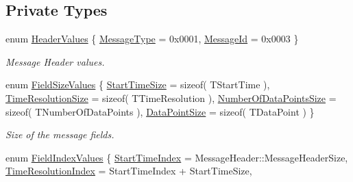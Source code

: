 \subsection*{Private Types}
\begin{DoxyCompactItemize}
\item 
enum \hyperlink{class_terra_swarm_1_1_asynchronous_1_1_client_data_ab125e3c9367fdafbd7adfcee2f4916ca}{Header\-Values} \{ \hyperlink{class_terra_swarm_1_1_asynchronous_1_1_client_data_ab125e3c9367fdafbd7adfcee2f4916caade31247f7e6ce63ad9d29f262e71f1f3}{Message\-Type} = 0x0001, 
\hyperlink{class_terra_swarm_1_1_asynchronous_1_1_client_data_ab125e3c9367fdafbd7adfcee2f4916caa9b9e910bbc8034727a892e32130a6a88}{Message\-Id} = 0x0003
 \}
\begin{DoxyCompactList}\small\item\em Message Header values. \end{DoxyCompactList}\item 
enum \hyperlink{class_terra_swarm_1_1_asynchronous_1_1_client_data_ac66a46fcb609d1205cef15f85cd551b0}{Field\-Size\-Values} \{ \hyperlink{class_terra_swarm_1_1_asynchronous_1_1_client_data_ac66a46fcb609d1205cef15f85cd551b0a669ddc8638e4c5d6c0ae519ff59f66c1}{Start\-Time\-Size} = sizeof( T\-Start\-Time ), 
\hyperlink{class_terra_swarm_1_1_asynchronous_1_1_client_data_ac66a46fcb609d1205cef15f85cd551b0ac13dfbedd3bb3241adca682ae0cae309}{Time\-Resolution\-Size} = sizeof( T\-Time\-Resolution ), 
\hyperlink{class_terra_swarm_1_1_asynchronous_1_1_client_data_ac66a46fcb609d1205cef15f85cd551b0a5042b9a88db56411ee2879d930f5defb}{Number\-Of\-Data\-Points\-Size} = sizeof( T\-Number\-Of\-Data\-Points ), 
\hyperlink{class_terra_swarm_1_1_asynchronous_1_1_client_data_ac66a46fcb609d1205cef15f85cd551b0a673cab9c8ea4ec18ec428a34c5a30eb2}{Data\-Point\-Size} = sizeof( T\-Data\-Point )
 \}
\begin{DoxyCompactList}\small\item\em Size of the message fields. \end{DoxyCompactList}\item 
enum \hyperlink{class_terra_swarm_1_1_asynchronous_1_1_client_data_aa673343abbf055d48820fa210064a1db}{Field\-Index\-Values} \{ \hyperlink{class_terra_swarm_1_1_asynchronous_1_1_client_data_aa673343abbf055d48820fa210064a1dba01941423451995fbb2656b85f2199b06}{Start\-Time\-Index} = Message\-Header\-:\-:Message\-Header\-Size, 
\hyperlink{class_terra_swarm_1_1_asynchronous_1_1_client_data_aa673343abbf055d48820fa210064a1dba5f51978c66fb63b9b2e7e7fabc6f8b32}{Time\-Resolution\-Index} = Start\-Time\-Index + Start\-Time\-Size, 

\end{DoxyCompactItemize}
